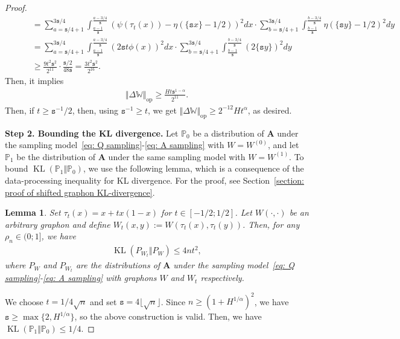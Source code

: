 \documentclass[11pt]{article}
\newcommand{\op}{\mathrm{op}}
\newcommand{\bA}{\bm{A}}
\newcommand{\bbW}{\mathbb{W}}
\newcommand{\bbP}{\mathbb{P}}
\newcommand{\KL}[2]{\operatorname{KL}\left (#1\Vert #2 \right )}
\newcommand{\<}{\langle}
\renewcommand{\>}{\rangle}
\newcommand{\ts}{\mathtt{s}}
\theoremstyle{plain}
\newtheorem{lemma}{Lemma}
\theoremstyle{definition}
\theoremstyle{remark}
\begin{document}
{\begin{proof}
\begin{align*}
        & \qquad = \sum_{a = \ts/4 + 1}^{3 \ts/4}  \int_{\frac{a - 1}{\ts}}^{\frac{a - 3/4}{\ts}} \left ( \psi(\tau_t(x)) -   \eta(\{\ts x\} - 1/2)  \right )^2 dx \cdot \sum_{b = \ts/4 + 1}^{3 \ts/4}\int_{\frac{b -1}{\ts}}^{\frac{b- 3/4}{\ts}} \eta(\{\ts y\} - 1/2)^2 dy \\
        & \qquad = \sum_{a = \ts/4 + 1}^{3 \ts/4}  \int_{\frac{a - 1}{\ts}}^{\frac{a - 3/4}{\ts}} \left (2\ts t \phi(x) \right )^2 dx \cdot \sum_{b = \ts/4 + 1}^{3 \ts/4}\int_{\frac{b -1}{\ts}}^{\frac{b- 3/4}{\ts}} (2 \{\ts y \})^2 dy \\
        & \qquad \ge \frac{9 t^2 \ts^2}{2^{11}} \cdot \frac{\ts/2}{48 \ts} = \frac{3 t^2 \ts^2}{2^{16}}.
    \end{align*}
    Then, it implies
    \begin{align*}
        \Vert \Delta \bbW \Vert_{\op} \ge \frac{H t \ts^{1-\alpha} }{2^{11}}.
    \end{align*}
    Then, if $t \ge \ts^{-1}/2$, then, using $\ts^{-1} \ge t$, we get $\Vert \Delta \bbW \Vert_{\op} \ge 2^{-12} H t^{\alpha}$, as desired.
    
	
	\medskip
	\noindent \textbf{Step 2. Bounding the KL divergence.} Let $\bbP_0$ be a distribution of $\bA$ under the sampling model~\eqref{eq: Q sampling}-\eqref{eq: A sampling} with $W=W^{(0)}$, and let $\bbP_1$ be the distribution of $\bA$ under the same sampling model with $W=W^{(1)}$. To bound $\KL{\bbP_1}{\bbP_0}$, we use the following lemma, which is a consequence of the data-processing inequality for KL divergence. For the proof, see Section~\ref{section: proof of shifted graphon KL-divergence}.
    \begin{lemma}
    \label{lemma: shifted graphon KL-divergence}
    Set $\tau_t(x) = x + t x(1-x)$ for $t \in [-1/2; 1/2]$. Let $W(\cdot, \cdot)$ be an arbitrary graphon and define $W_t(x, y) := W(\tau_t(x), \tau_t(y))$. Then, for any $\rho_n \in (0; 1]$, we have
    \begin{align*}
        \KL{P_{W_t}}{P_W} \le 4 n t^2,
    \end{align*}
    where $P_W$ and $P_{W_t}$ are the distributions of $\bA$ under the sampling model~\eqref{eq: Q sampling}-\eqref{eq: A sampling} with graphons $W$ and $W_t$ respectively.
    \end{lemma}

   We choose $t = 1/4 \sqrt{n}$ and set $\ts =  4 \lfloor \sqrt{n} \rfloor$. Since $n \ge (1 + H^{1/\alpha})^2$, we have $\ts \ge \max \{2 , H^{1/\alpha}\}$, so the above construction is valid. Then, we have $\KL{\bbP_1}{\bbP_0} \le 1/4$.


\end{proof}}
\end{document}
